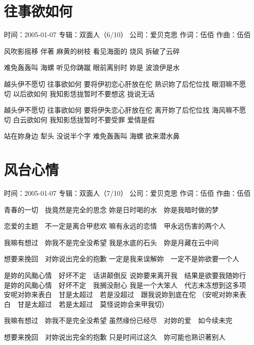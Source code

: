 \documentclass[UTF8,a4paper,oneside,twocolumn,12pt]{ctexbook}
\newcommand{\infopair}[2]{\textbullet #1：#2}
\newcommand{\zc}[1][伍佰]{\infopair{作词}{#1}}
\newcommand{\zq}[1][伍佰]{\infopair{作曲}{#1}}
\newcommand{\zj}[1]{\infopair{专辑}{#1}}
\newcommand{\sj}[1]{\infopair{时间}{#1}}
\newcommand{\gs}[1]{\infopair{公司}{#1}}
\newenvironment{info}{\begin{flushleft}\kaishu
	}
	{\end{flushleft}\normalsize\yahei\par}
\newenvironment{lyric}{
	}
{}
\begin{document}
\section{往事欲如何}
\begin{info}
	\sj{2005-01-07}
	\zj{双面人（6/10）}
	\gs{爱贝克思}
	\zc
	\zq
\end{info}
\begin{lyric}
	风吹影摇移 伴著 麻黄的树枝
	看见海面的 烧风 拆破了云碎

	难免轰轰叫 海螺 听见你踌蹴
	眼前离别时 妳是 波浪伊是水

	越头伊不愿切 往事欲如何
	要将伊初恋心肝放在佗 熟识妳了后佗位找
	眼泪嘛不愿切 以后欲如何
	我知影恁拢暂时不要想这 拢说无话

	越头伊不愿切 往事欲如何
	要将伊失恋心肝放在佗 离开妳了后佗位找
	海风嘛不愿切 白云欲如何
	我知影恁拢暂时不要受罪 爱情是假

	站在妳身边 犁头 没说半个字
	难免轰轰叫 海螺 欲来潜水鼻
\end{lyric}

\section{风台心情}
\begin{info}
	\sj{2005-01-07}
	\zj{双面人（7/10）}
	\gs{爱贝克思}
	\zc
	\zq
\end{info}
\begin{lyric}
	青春的一切　拢竟然是完全的思念
	妳是日时喝的水　妳是我暗时做的梦

	恋爱的主题　不一定是离合甲悲欢
	嘛有永远的恋情　甲永远伤害的两个人

	我嘛有想过　妳我不是完全没希望
	我是水底的石头　妳是月藏在云中间

	想要来挽回　对妳说出完全的抱歉
	一定是我来误解妳　一定不是妳欲要一个人

	是妳的风颱心情　好坏不定　话讲颠倒反
	说妳要来离开我　结果是欲要我随妳行
	是妳的风颱心情　好坏不定　我搁没耐心
	我是一个大笨人　代志未冻想到这多项
	安呢对妳来表白　甘是太超过　若是没超过　跟我说妳到底在佗
	（安呢对妳来表白　甘是太超过　若是太超过　莫怪说妳会来甲我切）

	我嘛有想过　妳我不是完全没希望
	虽然缘份已经尽　对妳的爱　如今续未完

	想要来挽回　对妳说出完全的抱歉
	只是时间过这久　妳可能也熟识著别人
\end{lyric}
\end{document}
